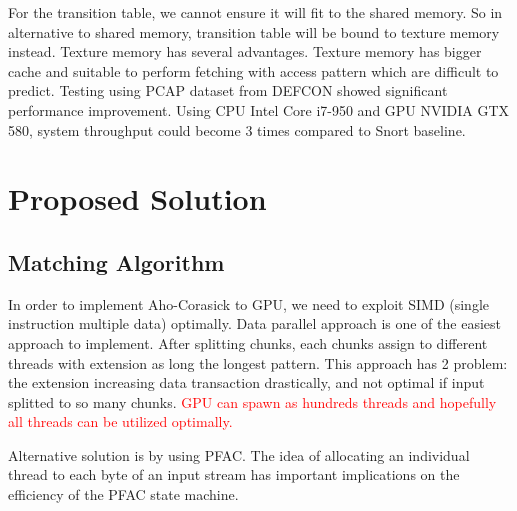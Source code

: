 \documentclass[conference]{IEEEtran}
\begin{document}
        For the transition table, we cannot ensure it will fit to the shared memory. So in alternative to shared memory, transition table will be bound to texture memory instead. Texture memory has several advantages. Texture memory has bigger cache and suitable to perform fetching with access pattern which are difficult to predict. Testing using PCAP dataset from DEFCON showed significant performance improvement. Using CPU Intel Core i7-950 and GPU NVIDIA GTX 580, system throughput could become 3 times compared to Snort baseline.

\section{Proposed Solution}
    \subsection{Matching Algorithm}
        In order to implement Aho-Corasick to GPU, we need to exploit SIMD (single instruction multiple data) optimally. Data parallel approach is one of the easiest approach to implement. After splitting chunks, each chunks assign to different threads with extension as long the longest pattern. This approach has 2 problem: the extension increasing data transaction drastically, and not optimal if input splitted to so many chunks. \textcolor{red}{GPU can spawn as hundreds threads and hopefully all threads can be utilized optimally.}

        Alternative solution is by using PFAC. The idea of allocating an individual thread to each byte of an input stream has important implications on the efficiency of the PFAC state machine. 
        
\end{document}
